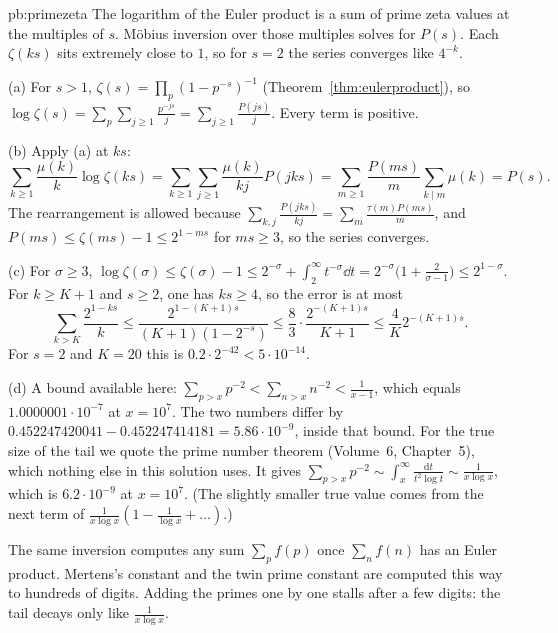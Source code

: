 \begin{solution}{pb:primezeta}
\idea The logarithm of the Euler product is a sum of prime zeta values at the multiples of $s$. Möbius inversion over those multiples solves for $P(s)$. Each $\zeta(ks)$ sits
extremely close to $1$, so for $s=2$ the series converges like $4^{-k}$.

\writeup (a) For $s>1$, $\zeta(s)=\prod_p(1-p^{-s})^{-1}$ (Theorem~\ref{thm:eulerproduct}), so $\log\zeta(s)=\sum_p\sum_{j\ge1}\frac{p^{-js}}j=\sum_{j\ge1}\frac{P(js)}j$. Every term is positive.

(b) Apply (a) at $ks$:
\[
\sum_{k\ge1}\frac{\mu(k)}k\log\zeta(ks)=\sum_{k\ge1}\sum_{j\ge1}\frac{\mu(k)}{kj}P(jks)=\sum_{m\ge1}\frac{P(ms)}m\sum_{k\mid m}\mu(k)=P(s).
\]
The rearrangement is allowed because $\sum_{k,j}\frac{P(jks)}{kj}=\sum_m\frac{\tau(m)P(ms)}m$, and $P(ms)\le\zeta(ms)-1\le2^{1-ms}$ for $ms\ge3$, so the series converges.

(c) For $\sigma\ge3$, $\log\zeta(\sigma)\le\zeta(\sigma)-1\le2^{-\sigma}+\int_2^\infty t^{-\sigma}\dd t=2^{-\sigma}\bigl(1+\frac2{\sigma-1}\bigr)\le2^{1-\sigma}$. For $k\ge K+1$ and $s\ge2$,
one has $ks\ge4$, so the error is at most
\[
\sum_{k>K}\frac{2^{1-ks}}k\le\frac{2^{1-(K+1)s}}{(K+1)(1-2^{-s})}\le\frac83\cdot\frac{2^{-(K+1)s}}{K+1}\le\frac4K2^{-(K+1)s}.
\]
For $s=2$ and $K=20$ this is $0.2\cdot2^{-42}<5\cdot10^{-14}$.

(d) A bound available here: $\sum_{p>x}p^{-2}<\sum_{n>x}n^{-2}<\frac1{x-1}$, which equals $1.0000001\cdot10^{-7}$ at $x=10^7$. The two numbers differ by
$0.452247420041-0.452247414181=5.86\cdot10^{-9}$, inside that bound. For the true size of the tail we quote the prime number theorem (Volume~6, Chapter~5), which
nothing else in this solution uses. It gives $\sum_{p>x}p^{-2}\sim\int_x^\infty\frac{\mathrm dt}{t^2\log t}\sim\frac1{x\log x}$, which is $6.2\cdot10^{-9}$ at $x=10^7$. (The slightly smaller
true value comes from the next term of $\frac1{x\log x}(1-\frac1{\log x}+\dots)$.)

\leads The same inversion computes any sum $\sum_pf(p)$ once $\sum_nf(n)$ has an Euler product. Mertens's constant and the twin prime constant are computed this way to hundreds of digits.
Adding the primes one by one stalls after a few digits: the tail decays only like $\frac1{x\log x}$.
\end{solution}

